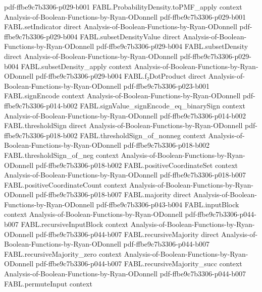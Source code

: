 \begin{theorem}
  {pdf-ffbe9c7b3306-p029-b001}
\proofstep
  {FABL.ProbabilityDensity.toPMF_apply}
  {context}
  {Analysis-of-Boolean-Functions-by-Ryan-ODonnell}
  {pdf-ffbe9c7b3306-p029-b001}
\proofstep
  {FABL.setIndicator}
  {direct}
  {Analysis-of-Boolean-Functions-by-Ryan-ODonnell}
  {pdf-ffbe9c7b3306-p029-b004}
\proofstep
  {FABL.subsetDensityValue}
  {direct}
  {Analysis-of-Boolean-Functions-by-Ryan-ODonnell}
  {pdf-ffbe9c7b3306-p029-b004}
\proofstep
  {FABL.subsetDensity}
  {direct}
  {Analysis-of-Boolean-Functions-by-Ryan-ODonnell}
  {pdf-ffbe9c7b3306-p029-b004}
\proofstep
  {FABL.subsetDensity_apply}
  {context}
  {Analysis-of-Boolean-Functions-by-Ryan-ODonnell}
  {pdf-ffbe9c7b3306-p029-b004}
\proofstep
  {FABL.f₂DotProduct}
  {direct}
  {Analysis-of-Boolean-Functions-by-Ryan-ODonnell}
  {pdf-ffbe9c7b3306-p023-b001}
\proofstep
  {FABL.signEncode}
  {context}
  {Analysis-of-Boolean-Functions-by-Ryan-ODonnell}
  {pdf-ffbe9c7b3306-p014-b002}
\proofstep
  {FABL.signValue_signEncode_eq_binarySign}
  {context}
  {Analysis-of-Boolean-Functions-by-Ryan-ODonnell}
  {pdf-ffbe9c7b3306-p014-b002}
\proofstep
  {FABL.thresholdSign}
  {direct}
  {Analysis-of-Boolean-Functions-by-Ryan-ODonnell}
  {pdf-ffbe9c7b3306-p018-b002}
\proofstep
  {FABL.thresholdSign_of_nonneg}
  {context}
  {Analysis-of-Boolean-Functions-by-Ryan-ODonnell}
  {pdf-ffbe9c7b3306-p018-b002}
\proofstep
  {FABL.thresholdSign_of_neg}
  {context}
  {Analysis-of-Boolean-Functions-by-Ryan-ODonnell}
  {pdf-ffbe9c7b3306-p018-b002}
\proofstep
  {FABL.positiveCoordinateSet}
  {context}
  {Analysis-of-Boolean-Functions-by-Ryan-ODonnell}
  {pdf-ffbe9c7b3306-p018-b007}
\proofstep
  {FABL.positiveCoordinateCount}
  {context}
  {Analysis-of-Boolean-Functions-by-Ryan-ODonnell}
  {pdf-ffbe9c7b3306-p018-b007}
\proofstep
  {FABL.majority}
  {direct}
  {Analysis-of-Boolean-Functions-by-Ryan-ODonnell}
  {pdf-ffbe9c7b3306-p043-b004}
\proofstep
  {FABL.inputBlock}
  {context}
  {Analysis-of-Boolean-Functions-by-Ryan-ODonnell}
  {pdf-ffbe9c7b3306-p044-b007}
\proofstep
  {FABL.recursiveInputBlock}
  {context}
  {Analysis-of-Boolean-Functions-by-Ryan-ODonnell}
  {pdf-ffbe9c7b3306-p044-b007}
\proofstep
  {FABL.recursiveMajority}
  {direct}
  {Analysis-of-Boolean-Functions-by-Ryan-ODonnell}
  {pdf-ffbe9c7b3306-p044-b007}
\proofstep
  {FABL.recursiveMajority_zero}
  {context}
  {Analysis-of-Boolean-Functions-by-Ryan-ODonnell}
  {pdf-ffbe9c7b3306-p044-b007}
\proofstep
  {FABL.recursiveMajority_succ}
  {context}
  {Analysis-of-Boolean-Functions-by-Ryan-ODonnell}
  {pdf-ffbe9c7b3306-p044-b007}
\proofstep
  {FABL.permuteInput}
  {context}

\end{theorem}
